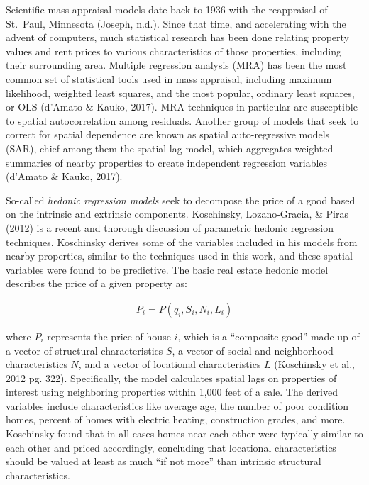 \documentclass[12pt,]{article}
\begin{document}
Scientific mass appraisal models date back to 1936 with the reappraisal
of St.~Paul, Minnesota (Joseph, n.d.). Since that time, and accelerating
with the advent of computers, much statistical research has been done
relating property values and rent prices to various characteristics of
those properties, including their surrounding area. Multiple regression
analysis (MRA) has been the most common set of statistical tools used in
mass appraisal, including maximum likelihood, weighted least squares,
and the most popular, ordinary least squares, or OLS (d'Amato \& Kauko,
2017). MRA techniques in particular are susceptible to spatial
autocorrelation among residuals. Another group of models that seek to
correct for spatial dependence are known as spatial auto-regressive
models (SAR), chief among them the spatial lag model, which aggregates
weighted summaries of nearby properties to create independent regression
variables (d'Amato \& Kauko, 2017).

So-called \emph{hedonic regression models} seek to decompose the price
of a good based on the intrinsic and extrinsic components. Koschinsky,
Lozano-Gracia, \& Piras (2012) is a recent and thorough discussion of
parametric hedonic regression techniques. Koschinsky derives some of the
variables included in his models from nearby properties, similar to the
techniques used in this work, and these spatial variables were found to
be predictive. The basic real estate hedonic model describes the price
of a given property as:

\[
\begin{aligned}
 P_i = P(q_i,S_i, N_i, L_i)
\end{aligned}
\]

\noindent where \(P_i\) represents the price of house \(i\), which is a
``composite good'' made up of a vector of structural characteristics
\(S\), a vector of social and neighborhood characteristics \(N\), and a
vector of locational characteristics \(L\) (Koschinsky et al., 2012 pg.
322). Specifically, the model calculates spatial lags on properties of
interest using neighboring properties within 1,000 feet of a sale. The
derived variables include characteristics like average age, the number
of poor condition homes, percent of homes with electric heating,
construction grades, and more. Koschinsky found that in all cases homes
near each other were typically similar to each other and priced
accordingly, concluding that locational characteristics should be valued
at least as much ``if not more'' than intrinsic structural
characteristics.
\end{document}
